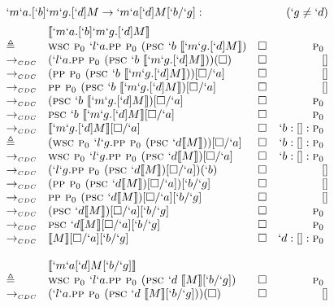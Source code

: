 \begin{Proof}
\[\begin{array}{llrr}
\end{array}
\]
\[
\begin{array}{llrr}
  \prooflabel{`m`a.[`b]`m`g.[`d]M \to `m`a[`d]M[`b/`g]} & (`g \not= `d) \\
             & \tr{`m`a.[`b]`m`g.[`d]M} \\
  \triangleq & \wsc \gp `l`a.\pp \gp (\psc `b\ \tr{`m`g.[`d]M})     & \square & \gp        \\
  \tocdc\    & (`l`a.\pp \gp (\psc `b\ \tr{`m`g.[`d]M}))(\square)   & \square & []         \\
  \tocdc\    & (\pp \gp (\psc `b\ \tr{`m`g.[`d]M}))[\square/`a]     & \square & []         \\
  \tocdc\    & \pp \gp (\psc `b\ \tr{`m`g.[`d]M})[\square/`a]       & \square & []         \\
  \tocdc\    & (\psc `b\ \tr{`m`g.[`d]M})[\square/`a]               & \square & \gp        \\
  \tocdc\    & \psc `b\ \tr{`m`g.[`d]M}[\square/`a]                 & \square & \gp        \\
  \tocdc\    & \tr{`m`g.[`d]M}[\square/`a]                          & \square & `b:[]:\gp  \\
  \triangleq & (\wsc \gp `l`g.\pp \gp (\psc `d \tr{M}))[\square/`a] & \square & `b:[]:\gp  \\
  \tocdc\    & \wsc \gp `l`g.\pp \gp (\psc `d \tr{M})[\square/`a]   & \square & `b:[]:\gp  \\
  \tocdc\    & (`l`g.\pp \gp (\psc `d \tr{M})[\square/`a])(`b)      & \square & []  \\
  \tocdc\    & (\pp \gp (\psc `d \tr{M})[\square/`a])[`b/`g]        & \square & []  \\
  \tocdc\    & \pp \gp (\psc `d \tr{M})[\square/`a][`b/`g]          & \square & []  \\
  \tocdc\    & (\psc `d \tr{M})[\square/`a][`b/`g]                  & \square & \gp  \\
  \tocdc\    & \psc `d \tr{M}[\square/`a][`b/`g]                    & \square & \gp  \\
  \tocdc\    & \tr{M}[\square/`a][`b/`g]                            & \square & `d:[]:\gp  \\
\\
             & \tr{`m`a[`d]M[`b/`g]} \\
  \triangleq & \wsc \gp `l`a.\pp \gp (\psc `d\ \tr{M}[`b/`g])   & \square & \gp       \\
  \tocdc\     & (`l`a.\pp \gp (\psc `d\ \tr{M}[`b/`g]))(\square) & \square & []        \\

\end{array}\]
\end{Proof}
